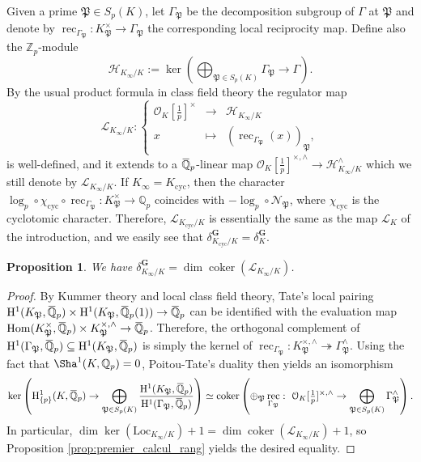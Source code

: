 \documentclass[12pt]{amsart}
\newcommand{\Q}{\mathbb{Q}}
\newcommand\Zp{{\mathbb{Z}_p}}
\newcommand\Qp{{\mathbb{Q}_p}}
\newcommand\cH{\mathcal{H}}
\newcommand\cN{\mathcal{N}}
\newcommand\cO{\mathcal{O}}
\newcommand\gP{\mathfrak{P}}
\newcommand\sL{\mathscr{L}}
\newcommand{\ob}[1]{\mkern 1.5mu\overline{\mkern-1.5mu#1\mkern-1.5mu}\mkern 1.5mu}
\newcommand{\Loc}{\mathrm{Loc}}
\DeclareMathOperator{\Hom}{Hom}
\DeclareMathOperator{\coker}{coker}
\DeclareMathOperator{\rec}{rec}
\newcommand{\cyc}{\textrm{cyc}}
\newcommand{\HH}{\mathrm{H}}
\theoremstyle{defstyle}
\theoremstyle{thmstyle}
\newtheorem{proposition}[subsubsection]{Proposition}
\begin{document}
	Given a prime $\gP\in S_p(K)$, let $\Gamma_{\gP}$ be the decomposition subgroup of $\Gamma$ at $\gP$ and denote by $\rec_{\Gamma_{\gP}} \colon K_\gP^\times \to \Gamma_\gP$ the corresponding local reciprocity map. Define also the $\Zp$-module \[\cH_{K_\infty/K}:=\ker\left(\bigoplus_{\gP\in S_p(K)} \Gamma_\gP \longrightarrow \Gamma \right).\] 
	By the usual product formula in class field theory the regulator map
	\begin{equation}\label{eq:def_sL_Gamma}
		\sL_{K_\infty/K} \colon \left\{\begin{array}{ccl}
			\cO_K[\tfrac{1}{p}]^\times & \longrightarrow &\cH_{K_\infty/K} \\
			x & \mapsto & (\rec_{\Gamma_\gP}(x))_\gP,
		\end{array}\right.
	\end{equation}
	is well-defined, and it extends to a $\ob{\Q}_p$-linear map $\cO_K[\tfrac{1}{p}]^{\times,\wedge} \to \cH_{K_\infty/K}^\wedge$ which we still denote by $\sL_{K_\infty/K}$. If $K_\infty=K_{\cyc}$, then the character $\log_p \circ \chi_\cyc \circ \rec_{\Gamma_{\gP}} \colon K_\gP^\times \longrightarrow \Qp$ coincides with $- \log_p \circ \cN_{\gP}$, where $\chi_\cyc$ is the cyclotomic character. Therefore, $\sL_{K_{\cyc}/K}$ is essentially the same as the map $\sL_K$ of the introduction, and we easily see that $\delta_{K_{\cyc}/K}^\textbf{G}=\delta_K^\textbf{G}$.
	
	\begin{proposition}\label{prop:generalisation_jaulent}
		We have $\delta^\textbf{G}_{K_\infty/K}=\dim \coker (\sL_{K_\infty/K})$.
	\end{proposition}
	\begin{proof}
		By Kummer theory and local class field theory, Tate's local pairing $\HH^1(K_\gP,\ob{\Q}_p) \times \HH^1(K_\gP,\ob{\Q}_p(1))\rightarrow \ob{\Q}_p$ can be identified with the evaluation map $\Hom(K_\gP^\times,\ob{\Q}_p) \times K_\gP^{\times,\wedge} \rightarrow \ob{\Q}_p$. Therefore, the orthogonal complement of $\HH^1(\Gamma_\gP,\ob{\Q}_p)\subseteq \HH^1(K_\gP,\ob{\Q}_p)$ is simply the kernel of $\rec_{\Gamma_\gP} \colon K_\gP^{\times,\wedge} \twoheadrightarrow \Gamma^\wedge_\gP$. Using the fact that $\Sha^1(K,\Qp)=0$, Poitou-Tate's duality then yields an isomorphism
		{\small 
			\[\ker\left(\HH^1_{\{p\}}(K,\ob{\Q}_p)\to \bigoplus_{\gP\in S_p(K)} \frac{\HH^1(K_\gP,\ob{\Q}_p)}{\HH^1(\Gamma_\gP,\ob{\Q}_p)}\right) \simeq \coker \left(\oplus_\gP \rec_{\Gamma_\gP}:\  \cO_K[\tfrac{1}{p}]^{\times,\wedge} \to \bigoplus_{\gP\in S_p(K)} \Gamma^\wedge_\gP\right).
			\]
			\normalsize}
		In particular, $\dim \ker(\Loc_{K_\infty/K})+1=\dim \coker(\sL_{K_\infty/K})+1$, so Proposition \ref{prop:premier_calcul_rang} yields the desired equality.
	\end{proof}
	
\end{document}
